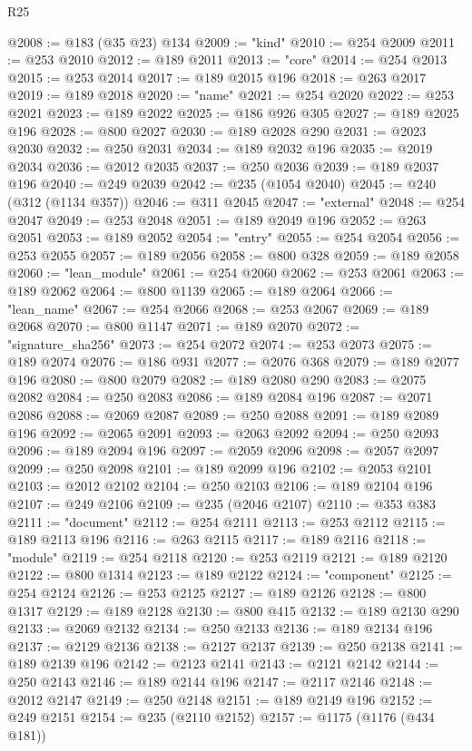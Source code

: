 \begin{lexlean}{R25}
\begin{coremodule}
@2008 := @183 (@35 @23) @134
@2009 := "kind"
@2010 := @254 @2009
@2011 := @253 @2010
@2012 := @189 @2011
@2013 := "core"
@2014 := @254 @2013
@2015 := @253 @2014
@2017 := @189 @2015 @196
@2018 := @263 @2017
@2019 := @189 @2018
@2020 := "name"
@2021 := @254 @2020
@2022 := @253 @2021
@2023 := @189 @2022
@2025 := @186 @926 @305
@2027 := @189 @2025 @196
@2028 := @800 @2027
@2030 := @189 @2028 @290
@2031 := @2023 @2030
@2032 := @250 @2031
@2034 := @189 @2032 @196
@2035 := @2019 @2034
@2036 := @2012 @2035
@2037 := @250 @2036
@2039 := @189 @2037 @196
@2040 := @249 @2039
@2042 := @235 (@1054 @2040)
@2045 := @240 (@312 (@1134 @357))
@2046 := @311 @2045
@2047 := "external"
@2048 := @254 @2047
@2049 := @253 @2048
@2051 := @189 @2049 @196
@2052 := @263 @2051
@2053 := @189 @2052
@2054 := "entry"
@2055 := @254 @2054
@2056 := @253 @2055
@2057 := @189 @2056
@2058 := @800 @328
@2059 := @189 @2058
@2060 := "lean_module"
@2061 := @254 @2060
@2062 := @253 @2061
@2063 := @189 @2062
@2064 := @800 @1139
@2065 := @189 @2064
@2066 := "lean_name"
@2067 := @254 @2066
@2068 := @253 @2067
@2069 := @189 @2068
@2070 := @800 @1147
@2071 := @189 @2070
@2072 := "signature_sha256"
@2073 := @254 @2072
@2074 := @253 @2073
@2075 := @189 @2074
@2076 := @186 @931
@2077 := @2076 @368
@2079 := @189 @2077 @196
@2080 := @800 @2079
@2082 := @189 @2080 @290
@2083 := @2075 @2082
@2084 := @250 @2083
@2086 := @189 @2084 @196
@2087 := @2071 @2086
@2088 := @2069 @2087
@2089 := @250 @2088
@2091 := @189 @2089 @196
@2092 := @2065 @2091
@2093 := @2063 @2092
@2094 := @250 @2093
@2096 := @189 @2094 @196
@2097 := @2059 @2096
@2098 := @2057 @2097
@2099 := @250 @2098
@2101 := @189 @2099 @196
@2102 := @2053 @2101
@2103 := @2012 @2102
@2104 := @250 @2103
@2106 := @189 @2104 @196
@2107 := @249 @2106
@2109 := @235 (@2046 @2107)
@2110 := @353 @383
@2111 := "document"
@2112 := @254 @2111
@2113 := @253 @2112
@2115 := @189 @2113 @196
@2116 := @263 @2115
@2117 := @189 @2116
@2118 := "module"
@2119 := @254 @2118
@2120 := @253 @2119
@2121 := @189 @2120
@2122 := @800 @1314
@2123 := @189 @2122
@2124 := "component"
@2125 := @254 @2124
@2126 := @253 @2125
@2127 := @189 @2126
@2128 := @800 @1317
@2129 := @189 @2128
@2130 := @800 @415
@2132 := @189 @2130 @290
@2133 := @2069 @2132
@2134 := @250 @2133
@2136 := @189 @2134 @196
@2137 := @2129 @2136
@2138 := @2127 @2137
@2139 := @250 @2138
@2141 := @189 @2139 @196
@2142 := @2123 @2141
@2143 := @2121 @2142
@2144 := @250 @2143
@2146 := @189 @2144 @196
@2147 := @2117 @2146
@2148 := @2012 @2147
@2149 := @250 @2148
@2151 := @189 @2149 @196
@2152 := @249 @2151
@2154 := @235 (@2110 @2152)
@2157 := @1175 (@1176 (@434 @181))

\end{coremodule}
\end{lexlean}
